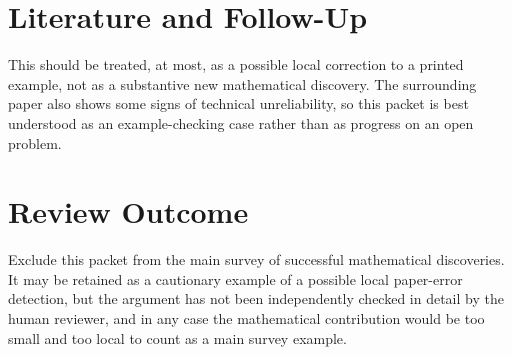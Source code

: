 \documentclass[11pt]{article}
\begin{document}
\section*{Literature and Follow-Up}

This should be treated, at most, as a possible local correction to a printed
example, not as a substantive new mathematical discovery.  The surrounding
paper also shows some signs of technical unreliability, so this packet is
best understood as an example-checking case rather than as progress on an
open problem.

\section*{Review Outcome}

Exclude this packet from the main survey of successful mathematical
discoveries.  It may be retained as a cautionary example of a possible local
paper-error detection, but the argument has not been independently checked in
detail by the human reviewer, and in any case the mathematical contribution
would be too small and too local to count as a main survey example.
\end{document}
